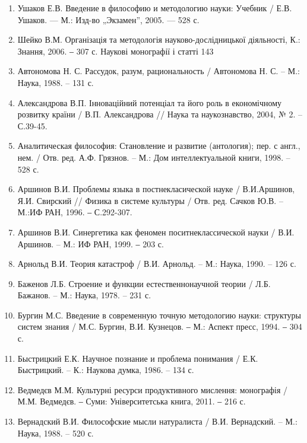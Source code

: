 \begin{enumerate}
\item Ушаков Е.В. Введение в философию и методологию науки: Учебник /
Е.В. Ушаков. --- М.: Изд-во „Экзамен”, 2005. --- 528 с.

\item Шейко В.М. Організація та методологія науково-дослідницької
діяльності, К.: Знання, 2006. ‒ 307 с.
Наукові монографії і статті
143

\item Автономова Н. С. Рассудок, разум, рациональность / Автономова Н. С. –
М.: Наука, 1988. – 131 с.

\item Александрова В.П. Інноваційний потенціал та його роль в економічному
розвитку країни / В.П. Александрова // Наука та наукознавство, 2004, № 2. –
С.39-45.

\item Аналитическая философия: Становление и развитие (антология); пер. с
англ., нем. / Отв. ред. А.Ф. Грязнов. – М.: Дом интеллектуальной книги, 1998. –
528 с.

\item Аршинов В.И. Проблемы языка в постнекласической науке /
В.И.Аршинов, Я.И. Свирский // Физика в системе культуры / Отв. ред. Сачков
Ю.В. – М.:ИФ РАН, 1996. ‒ С.292-307.

\item Аршинов В.И. Синергетика как феномен поситнеклассической науки /
В.И. Аршинов. – М.: ИФ РАН, 1999. ‒ 203 с.

\item Арнольд В.И. Теория катастроф / В.И. Арнольд. – М.: Наука, 1990. – 126
с.

\item Баженов Л.Б. Строение и функции естественнонаучной теории / Л.Б.
Бажанов. – М.: Наука, 1978. – 231 с.

\item Бургин М.С. Введение в современную точную методологию науки:
структуры систем знания / М.С. Бургин, В.И. Кузнецов. ‒ М.: Аспект пресс,
1994. ‒ 304 с.

\item Быстрицкий Е.К. Научное познание и проблема понимания / Е.К.
Быстрицкий. – К.: Наукова думка, 1986. – 134 с.

\item Ведмедєв М.М. Культурні ресурси продуктивного мислення: монографія
/ М.М. Ведмедєв. ‒ Суми: Університетська книга, 2011. ‒ 216 с.

\item Вернадский В.И. Философские мысли натуралиста / В.И. Вернадский. –
М.: Наука, 1988. – 520 с.


\end{enumerate}
